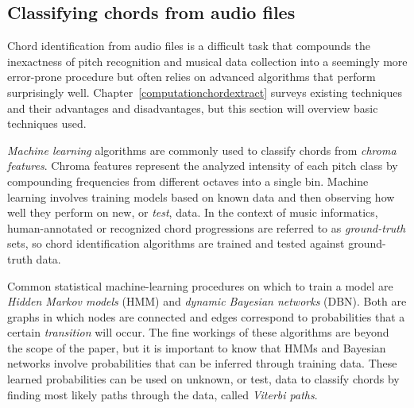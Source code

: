 \subsection{Classifying chords from audio files}

Chord identification from audio files is a difficult task that compounds the inexactness of pitch recognition and musical data collection into a seemingly more error-prone procedure but often relies on advanced algorithms that perform surprisingly well. Chapter~\ref{computationchordextract} surveys existing techniques and their advantages and disadvantages, but this section will overview basic techniques used.

\textit{Machine learning} algorithms are commonly used to classify chords from \textit{chroma features}. Chroma features represent the analyzed intensity of each pitch class by compounding frequencies from different octaves into a single bin. Machine learning involves training models based on known data and then observing how well they perform on new, or \textit{test}, data. In the context of music informatics, human-annotated or recognized chord progressions are referred to as \textit{ground-truth} sets\cite{BurgoyneEtAl_2011_AnExpeGrouSet}, so chord identification algorithms are trained and tested against ground-truth data.

Common statistical machine-learning procedures on which to train a model are \textit{Hidden Markov models} (HMM) and \textit{dynamic Bayesian networks} (DBN). Both are graphs in which nodes are connected and edges correspond to probabilities that a certain \textit{transition} will occur. The fine workings of these algorithms are beyond the scope of the paper, but it is important to know that HMMs and Bayesian networks involve probabilities that can be inferred through training data. These learned probabilities can be used on unknown, or test, data to classify chords by finding most likely paths through the data, called \textit{Viterbi paths}.